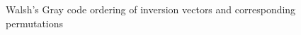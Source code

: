 \begin{figure}
    \centering 
    \caption{Walsh's Gray code ordering of inversion vectors and corresponding permutations}
    \label{Fig:Perm5,5}
\end{figure}